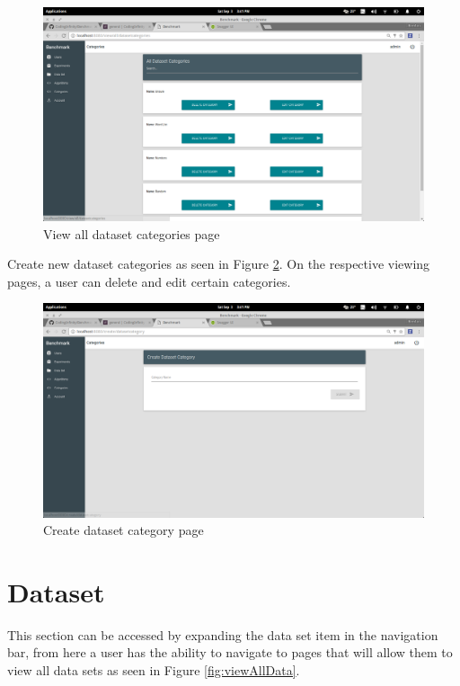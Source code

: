 \documentclass[11pt,a4paper]{article}
\begin{document}
\begin{figure}[H]
	\begin{center}
		\includegraphics[scale=0.3]{../Images/User Manual/View Dataset Categories.png}
		\caption{View all dataset categories page}
		\label{fig:viewDataCat}
	\end{center}  
\end{figure}
\clearpage
Create new dataset categories as seen in Figure \ref{fig:createDataCat}.
On the respective viewing pages, a user can delete and edit certain categories.
\begin{figure}[H]
	\begin{center}
		\includegraphics[scale=0.3]{../Images/User Manual/Create Dataset Category.png}
		\caption{Create dataset category page}
		\label{fig:createDataCat}
	\end{center}  
\end{figure}

\section{Dataset}
This section can be accessed by expanding the data set item in the navigation bar, from
here a user has the ability to navigate to pages that will allow them to view all data
sets as seen in Figure \ref{fig:viewAllData}.
\end{document}
